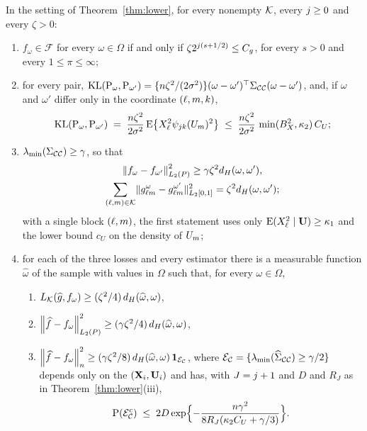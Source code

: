 \begin{lemma}
\label{lem:hypercube}
In the setting of Theorem~\ref{thm:lower}, for every nonempty $\mathcal{K}$, every
$j \ge 0$ and every $\zeta > 0$:
\begin{enumerate}
\item[(i)] $f_{\omega} \in \mathcal{F}$ for every $\omega \in \Omega$ if and
only if $\zeta2^{j(s+1/2)} \le C_g$, for every $s > 0$ and every
$1 \le \pi \le \infty$;
\item[(ii)] for every pair,
$\operatorname{KL}(\mathrm{P}_{\omega},\mathrm{P}_{\omega'}) =
\{n\zeta^{2}/(2\sigma^{2})\}(\omega-\omega')^{\top}\Sigma_{\mathcal{C}\mathcal{C}}(\omega-\omega')$,
and, if $\omega$ and $\omega'$ differ only in the coordinate $(\ell,m,k)$,
\[
  \operatorname{KL}(\mathrm{P}_{\omega},\mathrm{P}_{\omega'})
  \;=\; \frac{n\zeta^{2}}{2\sigma^{2}}\,\mathrm{E}\bigl\{X_{\ell}^{2}\psi_{jk}(U_{m})^{2}\bigr\}
  \;\le\; \frac{n\zeta^{2}}{2\sigma^{2}}\,\min(B_X^{2},\kappa_2)\,C_U ;
\]
\item[(iii)] $\lambda_{\min}(\Sigma_{\mathcal{C}\mathcal{C}}) \ge \gamma$, so that
\begin{gather*}
  \left\lVert f_{\omega}-f_{\omega'} \right\rVert_{L_2(P)}^{2} \ge \gamma\zeta^{2}d_{H}(\omega,\omega'),
  \\
  \sum_{(\ell,m)\in\mathcal{K}}\lVert g_{\ell m}^{\omega} -
  g_{\ell m}^{\omega'}\rVert_{L_2[0,1]}^{2} = \zeta^{2}d_{H}(\omega,\omega') ;
\end{gather*}
with a single block $(\ell,m)$, the first statement uses only
$\mathrm{E}(X_{\ell}^{2}\mid\mathbf{U}) \ge \kappa_1$ and the lower bound $c_U$ on the
density of $U_{m}$;
\item[(iv)] for each of the three losses and every estimator there is a
measurable function $\widehat\omega$ of the sample with values in $\Omega$
such that, for every $\omega \in \Omega$,
\begin{enumerate}
\item[(a)] $L_{\mathcal{K}}(\widehat{g},f_{\omega}) \ge (\zeta^{2}/4)\,d_{H}(\widehat\omega,\omega)$,
\item[(b)] $\left\lVert \widehat{f}-f_{\omega} \right\rVert_{L_2(P)}^{2} \ge (\gamma\zeta^{2}/4)\,d_{H}(\widehat\omega,\omega)$,
\item[(c)] $\left\lVert \widehat{f}-f_{\omega} \right\rVert_{n}^{2} \ge (\gamma\zeta^{2}/8)\,
d_{H}(\widehat\omega,\omega)\,\mathbf{1}_{\mathcal{E}_{\mathcal{C}}}$, where
$\mathcal{E}_{\mathcal{C}} = \{\lambda_{\min}(\widehat{\Sigma}_{\mathcal{C}\mathcal{C}}) \ge \gamma/2\}$
depends only on the $(\mathbf{X}_i,\mathbf{U}_i)$ and has, with $J = j+1$ and $D$ and
$R_J$ as in Theorem~\ref{thm:lower}(iii),
\[
  \mathrm{P}(\mathcal{E}_{\mathcal{C}}^{c}) \;\le\;
  2D\exp\Bigl\{-\frac{n\gamma^{2}}{8R_{J}(\kappa_2C_U + \gamma/3)}\Bigr\} .
\]
\end{enumerate}
\end{enumerate}
\end{lemma}

